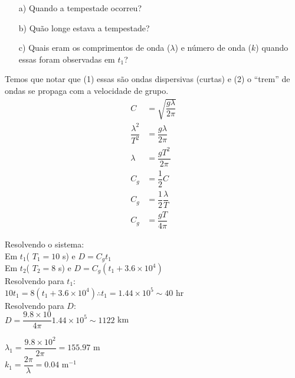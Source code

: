 \documentclass[letterpaper,portuguese,12pt,pdftex]{exam}
\begin{document}
\begin{questions}
\begin{parts}
  \begin{itemize}
    \item[a)] Quando a tempestade ocorreu?
    \item[b)] Quão longe estava a tempestade?
    \item[c)] Quais eram os comprimentos de onda ($\lambda$) e número de onda
    ($k$) quando essas foram observadas em $t_1$?
  \end{itemize}

  \begin{solution}
  Temos que notar que (1) essas são ondas dispersivas (curtas) e (2) o ``trem''
  de ondas se propaga com a velocidade de grupo.
  \begin{align*}
    C &= \sqrt{\dfrac{g\lambda}{2\pi}}\\
    \dfrac{\lambda^2}{T^2} &= \dfrac{g\lambda}{2\pi}\\
    \lambda &= \dfrac{gT^2}{2\pi}\\
    C_g &= \dfrac{1}{2}C\\
    C_g &= \dfrac{1}{2}\dfrac{\lambda}{T}\\
    C_g &= \dfrac{gT}{4\pi}
  \end{align*}

  Resolvendo o sistema:\\
  Em $t_1$( \(T_1 = 10\) s) e \(D = C_gt_1\)\\
  Em $t_2$( \(T_2 = 8\) s) e \(D = C_g(t_1 + 3.6 \times 10^4)\)\\
  Resolvendo para $t_1$:\\
  $10t_1 = 8(t_1 + 3.6 \times 10^4) \therefore t_1 = 1.44 \times 10^5 \sim 40$  hr\\
  Resolvendo para $D$:\\
  $D = \dfrac{9.8 \times 10}{4\pi}{1.44 \times 10^5} \sim 1122$  km


  $\lambda_1 = \dfrac{9.8 \times 10^2}{2\pi} = 155.97$ m\\
  $k_1 = \dfrac{2\pi}{\lambda} = 0.04$ m$^{-1}$
  \end{solution}

\end{parts}

\question
\end{questions}
\end{document}
